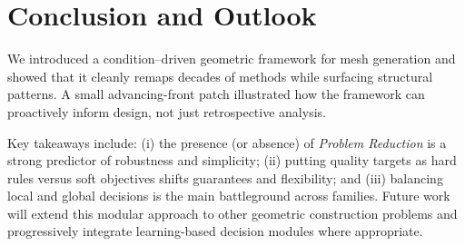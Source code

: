 \section{Conclusion and Outlook}
We introduced a condition--driven geometric framework for mesh generation and showed that it cleanly remaps decades of methods while surfacing structural patterns. A small advancing-front patch illustrated how the framework can proactively inform design, not just retrospective analysis.

Key takeaways include: (i) the presence (or absence) of \emph{Problem Reduction} is a strong predictor of robustness and simplicity; (ii) putting quality targets as hard rules versus soft objectives shifts guarantees and flexibility; and (iii) balancing local and global decisions is the main battleground across families. Future work will extend this modular approach to other geometric construction problems and progressively integrate learning-based decision modules where appropriate.
